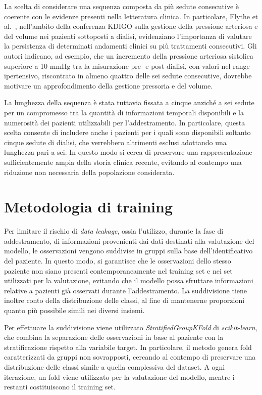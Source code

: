 \documentclass[a4paper,12pt]{report}
\begin{document}
La scelta di considerare una sequenza composta da più sedute consecutive è coerente con le evidenze presenti nella letteratura clinica. In particolare, Flythe et al.~\cite{FLYTHE2020}, nell'ambito della conferenza KDIGO sulla gestione della pressione arteriosa e del volume nei pazienti sottoposti a dialisi, evidenziano l'importanza di valutare la persistenza di determinati andamenti clinici su più trattamenti consecutivi. Gli autori indicano, ad esempio, che un incremento della pressione arteriosa sistolica superiore a 10 mmHg tra la misurazione pre- e post-dialisi, con valori nel range ipertensivo, riscontrato in almeno quattro delle sei sedute consecutive, dovrebbe motivare un approfondimento della gestione pressoria e del volume.

La lunghezza della sequenza è stata tuttavia fissata a cinque anziché a sei sedute per un compromesso tra la quantità di informazioni temporali disponibili e la numerosità dei pazienti utilizzabili per l'addestramento. In particolare, questa scelta consente di includere anche i pazienti per i quali sono disponibili soltanto cinque sedute di dialisi, che verrebbero altrimenti esclusi adottando una lunghezza pari a sei. In questo modo si cerca di preservare una rappresentazione sufficientemente ampia della storia clinica recente, evitando al contempo una riduzione non necessaria della popolazione considerata.

\section{Metodologia di training}
\label{sec:training_method}

Per limitare il rischio di \textit{data leakage}, ossia l'utilizzo, durante la fase di addestramento, di informazioni provenienti dai dati destinati alla valutazione del modello, le osservazioni vengono suddivise in gruppi sulla base dell'identificativo del paziente. In questo modo, si garantisce che le osservazioni dello stesso paziente non siano presenti contemporaneamente nel training set e nei set utilizzati per la valutazione, evitando che il modello possa sfruttare informazioni relative a pazienti già osservati durante l'addestramento. La suddivisione tiene inoltre conto della distribuzione delle classi, al fine di mantenerne proporzioni quanto più possibile simili nei diversi insiemi.

Per effettuare la suddivisione viene utilizzato \textit{StratifiedGroupKFold} di \textit{scikit-learn}, che combina la separazione delle osservazioni in base al paziente con la stratificazione rispetto alla variabile target. In particolare, il metodo genera fold caratterizzati da gruppi non sovrapposti, cercando al contempo di preservare una distribuzione delle classi simile a quella complessiva del dataset. A ogni iterazione, un fold viene utilizzato per la valutazione del modello, mentre i restanti costituiscono il training set.
\end{document}
